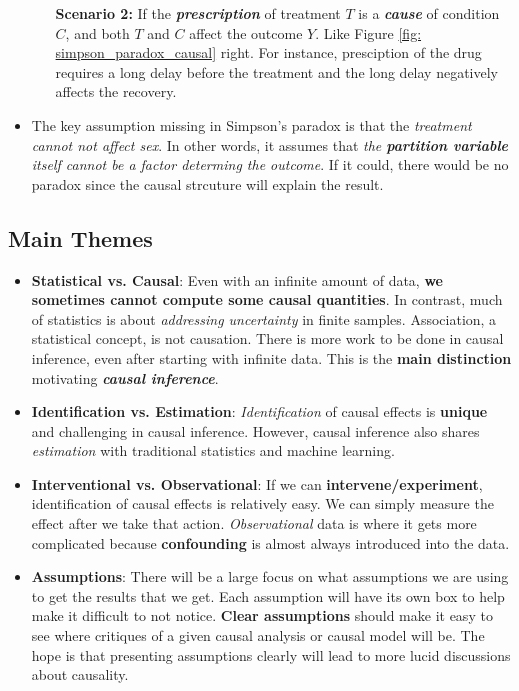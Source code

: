 \documentclass[11pt]{article}
\begin{document}
\begin{itemize}
\begin{itemize}
\item[\textbf{Scenario 2:}] If the \emph{\textbf{prescription}} of treatment $T$ is a \emph{\textbf{cause}} of condition $C$, and both $T$ and $C$ affect the outcome $Y$. Like Figure \ref{fig: simpson_paradox_causal} right. For instance,  presciption of the drug requires a long delay before the treatment and the long delay negatively affects the recovery.  
\end{itemize}

\item The key assumption missing in Simpson's paradox is that the \emph{treatment cannot not affect sex}. In other words, it assumes that \emph{the \textbf{partition variable} itself cannot be a factor determing the outcome}. If it could, there would be no paradox since the causal strcuture will explain the result. 
\end{itemize}

\subsection{Main Themes}
\begin{itemize}
\item \textbf{Statistical vs. Causal}: Even with an infinite amount of data, \textbf{we sometimes cannot compute some causal quantities}. In contrast, much of
statistics is about \emph{addressing uncertainty} in finite samples. Association, a statistical concept, is not causation. There is more work to be done in causal inference, even after starting with infinite data. This is the \textbf{main distinction} motivating \textbf{\emph{causal inference}}. 

\item \textbf{Identification vs. Estimation}: \emph{Identification} of causal effects is \textbf{unique} and challenging  in causal inference. However, causal inference also shares \emph{estimation} with traditional statistics and machine learning.

\item \textbf{Interventional vs. Observational}: If we can \textbf{intervene/experiment}, identification of causal effects is relatively easy. We can simply measure the effect after we take that action. \emph{Observational} data is where it gets more complicated because \textbf{confounding} is almost always introduced into the data.

\item \textbf{Assumptions}: There will be a large focus on what assumptions we are using to get the results that we get. Each assumption will have its own
box to help make it difficult to not notice. \textbf{Clear assumptions} should make it easy to see where critiques of a given causal analysis or causal model will be. The hope is that presenting assumptions clearly will lead to more lucid discussions about causality.
\end{itemize}
\end{document}
